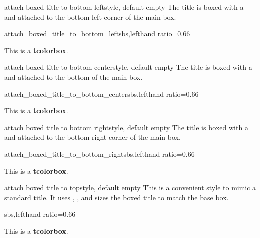 \begin{docTcbKey}{attach boxed title to bottom left}{}{style, default empty}
The title is boxed with a  and attached to
the bottom left corner of the main box.
\begin{exdispExample*}{attach_boxed_title_to_bottom_left}{sbs,lefthand ratio=0.66}
\begin{tcolorbox}[enhanced,title=My title,
  attach boxed title to bottom left]
  This is a \textbf{tcolorbox}.
\end{tcolorbox}
\end{exdispExample*}
\end{docTcbKey}

\begin{docTcbKey}{attach boxed title to bottom center}{}{style, default empty}
The title is boxed with a  and attached to
the bottom of the main box.
\begin{exdispExample*}{attach_boxed_title_to_bottom_center}{sbs,lefthand ratio=0.66}
\begin{tcolorbox}[enhanced,title=My title,
  attach boxed title to bottom center]
  This is a \textbf{tcolorbox}.
\end{tcolorbox}
\end{exdispExample*}
\end{docTcbKey}

\begin{docTcbKey}{attach boxed title to bottom right}{}{style, default empty}
The title is boxed with a  and attached to
the bottom right corner of the main box.
\begin{exdispExample*}{attach_boxed_title_to_bottom_right}{sbs,lefthand ratio=0.66}
\begin{tcolorbox}[enhanced,title=My title,
  attach boxed title to bottom right]
  This is a \textbf{tcolorbox}.
\end{tcolorbox}
\end{exdispExample*}
\end{docTcbKey}


\clearpage
\begin{docTcbKey}[][doc new=2016-02-26]{attach boxed title to top}{}{style, default empty}
  This is a convenient style to mimic a standard title.
  It uses ,
  , and sizes the boxed title to match
  the base box.
\begin{dispExample*}{sbs,lefthand ratio=0.66}
\begin{tcolorbox}[enhanced,title=My title,
  attach boxed title to top,
  boxed title style={colframe=red}]
  This is a \textbf{tcolorbox}.
\end{tcolorbox}
\end{dispExample*}
\end{docTcbKey}

